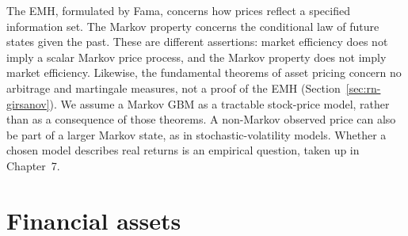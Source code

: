 The EMH, formulated by Fama\cite{Fama1970}, concerns how prices reflect a specified information set.
The Markov property concerns the conditional law of future states given the past.
These are different assertions: market efficiency does not imply a scalar Markov price process, and the Markov property does not imply market efficiency.
Likewise, the fundamental theorems of asset pricing concern no arbitrage and martingale measures, not a proof of the EMH (Section~\ref{sec:rn-girsanov}).
We assume a Markov GBM as a tractable stock-price model, rather than as a consequence of those theorems.
A non-Markov observed price can also be part of a larger Markov state, as in stochastic-volatility models.
Whether a chosen model describes real returns is an empirical question, taken up in Chapter~7.

\section{Financial assets}

